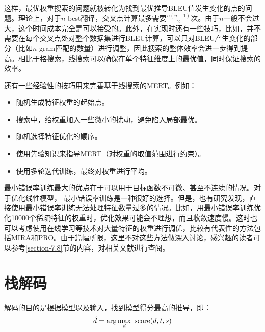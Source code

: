 \parinterval 这样，最优权重搜索的问题就被转化为找到最优推导BLEU值发生变化的点的问题。理论上，对于$n$-best翻译，交叉点计算最多需要$\frac{n(n-1)}{2}$次。由于$n$一般不会过大，这个时间成本完全是可以接受的。此外，在实现时还有一些技巧，比如，并不需要在每个交叉点处对整个数据集进行BLEU计算，可以只对BLEU产生变化的部分（比如$n$-gram匹配的数量）进行调整，因此搜索的整体效率会进一步得到提高。相比于格搜索，线搜索可以确保在单个特征维度上的最优值，同时保证搜索的效率。

\parinterval 还有一些经验性的技巧用来完善基于线搜索的MERT。例如：

\begin{itemize}
\vspace{0.5em}
\item 随机生成特征权重的起始点。
\vspace{0.5em}
\item 搜索中，给权重加入一些微小的扰动，避免陷入局部最优。
\vspace{0.5em}
\item 随机选择特征优化的顺序。
\vspace{0.5em}
\item 使用先验知识来指导MERT（对权重的取值范围进行约束）。
\vspace{0.5em}
\item 使用多轮迭代训练，最终对权重进行平均。
\vspace{0.5em}
\end{itemize}

\parinterval 最小错误率训练最大的优点在于可以用于目标函数不可微、甚至不连续的情况。对于优化线性模型， 最小错误率训练是一种很好的选择。但是，也有研究发现，直接使用最小错误率训练无法处理特征数量过多的情况。比如，用最小错误率训练优化10000个稀疏特征的权重时，优化效果可能会不理想，而且收敛速度慢。这时也可以考虑使用在线学习等技术对大量特征的权重进行调优，比较有代表性的方法包括MIRA和PRO。由于篇幅所限，这里不对这些方法做深入讨论，感兴趣的读者可以参考\ref{section-7.8}节的内容，对相关文献进行查阅。


\sectionnewpage
\section{栈解码}

\parinterval 解码的目的是根据模型以及输入，找到模型得分最高的推导，即：
\begin{eqnarray}
\hat{d} = \arg\max_{d}\ \textrm{score}(d,{t},{s})
\label{eq:7-21}
\end{eqnarray}

